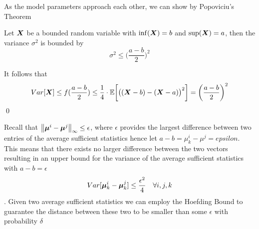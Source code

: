 As the model parameters approach each other, we can show by Popoviciu's Theorem
\begin{theorem}
    Let $\boldsymbol{X}$ be a bounded random variable with $\inf(\boldsymbol{X}) = b$ and $\sup(\boldsymbol{X}) = a$, 
    then the variance $\sigma^2$ is bounded by 
    \begin{equation}
        \sigma^2 \leq \bigg(\frac{a-b}{2}\bigg)^{2}
    \end{equation}
\end{theorem}



It follows that
\begin{equation*}
    Var[\boldsymbol{X}] \leq f(\frac{a-b}{2}) \leq  \frac{1}{4} \cdot \mathbb{E}\bigg[\big((\boldsymbol{X} - b) - (\boldsymbol{X} - a)\big)^2\bigg]  =  \bigg(\frac{a-b}{2}\bigg)^2 
\end{equation*}\qed

Recall that $\left\lVert\boldsymbol{\mu}^{i} -  \boldsymbol{\mu}^{j}\right\rVert_\infty \leq  \epsilon$, where $\epsilon$ provides the largest difference between two entries of the average sufficient statistics hence let $a - b = \mu^{i}_k - \mu^{j} = epsilon$.
This means that there exists no larger difference between the two vectors resulting in an upper bound for the variance of the average sufficient statistics with $a - b = \epsilon$ 
\begin{equation*}
    Var[\boldsymbol{\mu}^{i}_k -  \boldsymbol{\mu}^{j}_k] \leq \frac{\epsilon^2}{4} \quad \forall i,j,k
\end{equation*}.
Given two average sufficient statistics we can employ the Hoefding Bound to guarantee the distance between these two to be smaller than some $\epsilon$ with probability $\delta$

